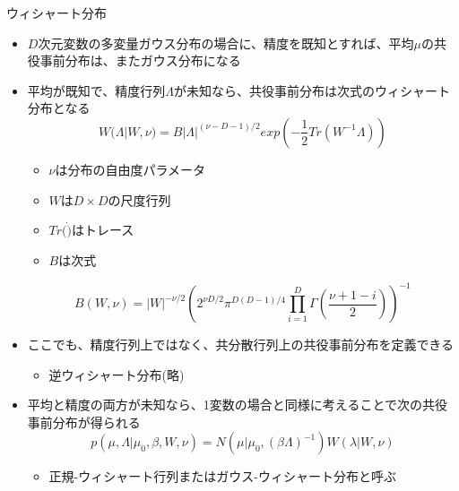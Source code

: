 \begin{frame}{ウィシャート分布}
 \begin{itemize}
	\item $D$次元変数の多変量ガウス分布の場合に、精度を既知とすれば、平均$\mu$の共役事前分布は、またガウス分布になる
	\item 平均が既知で、精度行列$\Lambda$が未知なら、共役事前分布は次式のウィシャート分布となる
				\begin{equation}
				 W(\Lambda|W,\nu) = B|\Lambda|^{(\nu-D-1)/2}exp(-\frac{1}{2}Tr(W^{-1}\Lambda))
				\end{equation}
				\begin{itemize}
				 \item $\nu$は分布の自由度パラメータ
				 \item $W$は$D \times D$の尺度行列
				 \item $Tr(\dot)$はトレース
				 \item $B$は次式
				\end{itemize}
				\begin{equation}
				 B(W,\nu) = |W|^{-\nu/2}(2^{\nu D/2}\pi^{D(D-1)/4}\prod_{i=1}^D\Gamma(\frac{\nu+1-i}{2}))^{-1}
				\end{equation}
	\item ここでも、精度行列上ではなく、共分散行列上の共役事前分布を定義できる
				\begin{itemize}
				 \item 逆ウィシャート分布(略)
				\end{itemize}
	\item 平均と精度の両方が未知なら、1変数の場合と同様に考えることで次の共役事前分布が得られる
				\begin{equation}
				 p(\mu,\Lambda|\mu_0,\beta,W,\nu) = N(\mu|\mu_0,(\beta\Lambda)^{-1})W(\lambda|W,\nu)
				\end{equation}
				\begin{itemize}
				 \item 正規-ウィシャート行列またはガウス-ウィシャート分布と呼ぶ
				\end{itemize}
 \end{itemize}
\end{frame}
